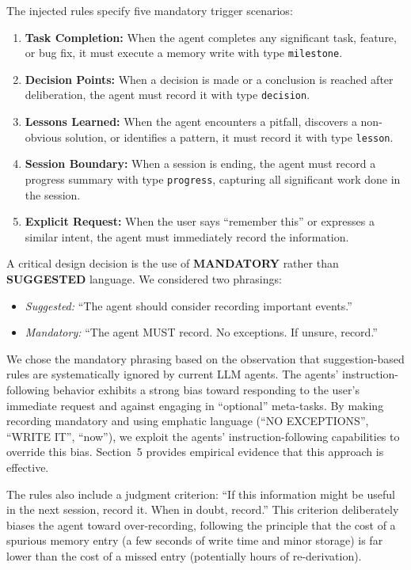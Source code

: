 \documentclass[11pt]{article}
\begin{document}
The injected rules specify five mandatory trigger scenarios:

\begin{enumerate}
    \item \textbf{Task Completion:} When the agent completes any significant task, feature, or bug fix, it must execute a memory write with type \texttt{milestone}.
    \item \textbf{Decision Points:} When a decision is made or a conclusion is reached after deliberation, the agent must record it with type \texttt{decision}.
    \item \textbf{Lessons Learned:} When the agent encounters a pitfall, discovers a non-obvious solution, or identifies a pattern, it must record it with type \texttt{lesson}.
    \item \textbf{Session Boundary:} When a session is ending, the agent must record a progress summary with type \texttt{progress}, capturing all significant work done in the session.
    \item \textbf{Explicit Request:} When the user says ``remember this'' or expresses a similar intent, the agent must immediately record the information.
\end{enumerate}

A critical design decision is the use of \textbf{MANDATORY} rather than \textbf{SUGGESTED} language. We considered two phrasings:

\begin{itemize}
    \item \emph{Suggested:} ``The agent should consider recording important events.''
    \item \emph{Mandatory:} ``The agent MUST record. No exceptions. If unsure, record.''
\end{itemize}

We chose the mandatory phrasing based on the observation that suggestion-based rules are systematically ignored by current LLM agents. The agents' instruction-following behavior exhibits a strong bias toward responding to the user's immediate request and against engaging in ``optional'' meta-tasks. By making recording mandatory and using emphatic language (``NO EXCEPTIONS'', ``WRITE IT'', ``now''), we exploit the agents' instruction-following capabilities to override this bias. Section~5 provides empirical evidence that this approach is effective.

The rules also include a judgment criterion: ``If this information might be useful in the next session, record it. When in doubt, record.'' This criterion deliberately biases the agent toward over-recording, following the principle that the cost of a spurious memory entry (a few seconds of write time and minor storage) is far lower than the cost of a missed entry (potentially hours of re-derivation).
\end{document}
